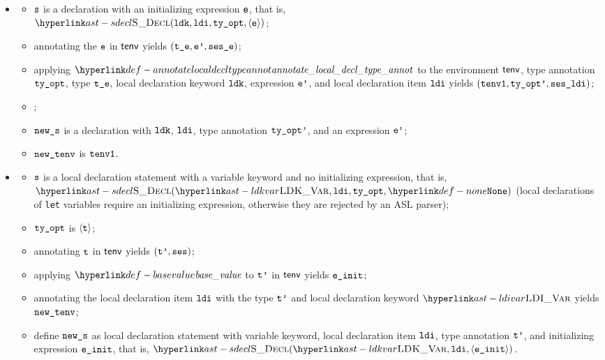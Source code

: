 \ProseParagraph
\OneApplies
\begin{itemize}
  \item {}
  \begin{itemize}
    \item $\texttt{s}$ is a declaration with an initializing expression $\texttt{e}$,
          that is, \\
          $\SDecl(\ldk, \ldi, \tyopt, \langle\ve\rangle)$;
    \item annotating the \rhsexpression{} $\texttt{e}$ in $\textsf{tenv}$ yields $(\texttt{t\_e},\texttt{e'}, \texttt{ses\_e})$\ProseOrTypeError;
    \item applying $\annotatelocaldecltypeannot$ to the environment $\textsf{tenv}$, type annotation $\texttt{ty\_opt}$, type $\texttt{t\_e}$, local declaration keyword $\texttt{ldk}$, expression $\texttt{e'}$, and local declaration item $\texttt{ldi}$ yields $(\texttt{tenv1}, \texttt{ty\_opt'}, \texttt{ses\_ldi})$\ProseOrTypeError;
    \item {};
    \item $\texttt{new\_s}$ is a declaration with $\texttt{ldk}$, $\texttt{ldi}$, type annotation $\texttt{ty\_opt'}$, and an expression $\texttt{e'}$;
    \item $\texttt{new\_tenv}$ is $\texttt{tenv1}$.
  \end{itemize}

  \item {}
  \begin{itemize}
  \item $\texttt{s}$ is a local declaration statement with a variable keyword and no initializing expression,
        that is, $\SDecl(\LDKVar, \ldi, \tyopt, \None)$ (local declarations of \texttt{let} variables require
        an initializing expression, otherwise they are rejected by an ASL parser);
  \item $\texttt{ty\_opt}$ is $\langle\texttt{t}\rangle$\ProseOrTypeError;
  \item annotating $\texttt{t}$ in $\textsf{tenv}$ yields $(\texttt{t'}, \texttt{ses})$\ProseOrTypeError;
  \item applying $\basevalue$ to $\texttt{t'}$ in $\textsf{tenv}$ yields $\texttt{e\_init}$\ProseOrTypeError;
  \item annotating the local declaration item $\texttt{ldi}$ with the type $\texttt{t'}$ and local declaration keyword $\LDIVar$
        yields $\texttt{new\_tenv}$\ProseOrTypeError;
  \item define $\texttt{new\_s}$ as local declaration statement with variable keyword, local declaration item $\texttt{ldi}$, type annotation $\texttt{t'}$, and initializing expression $\texttt{e\_init}$, that is, $\SDecl(\LDKVar, \ldi, \langle\veinit\rangle)$.
  \end{itemize}
\end{itemize}

